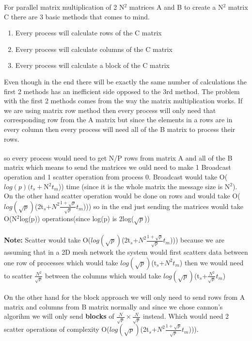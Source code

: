 For parallel matrix multiplication of 2 N$^2$ matrices A and B to create a N$^2$ matrix C there are 3 basic methods that comes to mind.
\begin{enumerate}
	\item Every process will calculate rows of the C matrix
	\item Every process will calculate columns of the C matrix
	\item Every process will calculate a block of the C matrix
\end{enumerate}
Even though in the end there will be exactly the same number of calculations the first 2 methods has an inefficient side opposed to the 3rd method. The problem with the first 2 methods comes from the way the matrix multiplication works. If we are using matrix row method then every process will only need that corresponding row from the A matrix but since the elements in a rows are in every column then every process will need all of the B matrix to process their rows. \\
\\
so every process would need to get N/P rows from matrix A and all of the B matrix which means to send the matrices we ould need to make 1 Broadcast operation and 1 scatter operation from process 0. Broadcast would take O($log(p)(t_s+$N$^2t_m$)) time (since it is the whole matrix the message size is N$^2$). On the other hand scatter operation would be done on rows and would take O($log(\sqrt{p})$(2t$_s$+$N^2\frac{1+\sqrt{p}}{\sqrt{p}}t_m$))) so in the end just sending the matrices would take O(N$^2$log(p)) operations(since log(p) is 2log($\sqrt{p}$))\\
\\
\textbf{Note:} Scatter would take O($log(\sqrt{p})$(2t$_s$+$N^2\frac{1+\sqrt{p}}{\sqrt{p}}t_m$))) because we are assuming that in a 2D mesh network the system would first scatters data between one row of processes which would take $log(\sqrt{p})$(t$_s$+$N^2t_m$) then we would need to scatter $\frac{N^2}{\sqrt{p}}$ between the columns which would take $log(\sqrt{p})$(t$_s$+$\frac{N^2}{\sqrt{p}}t_m$)\\
\\
On the other hand for the block approach we will only need to send rows from A matrix and columns from B matrix normally and since we chose cannon's algorihm we will only send \textbf{blocks} of $\frac{N}{\sqrt{p}}\times \frac{N}{\sqrt{p}}$ instead. Which would need 2 scatter operations of complexity O($log(\sqrt{p})$(2t$_s$+$N^2\frac{1+\sqrt{p}}{\sqrt{p}}t_m$))).

